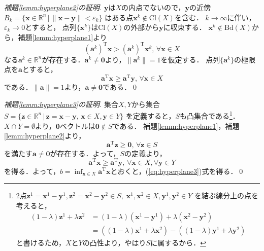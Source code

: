 \documentclass[dvipdfmx]{jsreport}
\begin{document}
\begin{proof}[補題\ref{lemm:hyperplane2}の証明]
  $\bm{y}$は$X$の内点でないので，$\bm{y}$の近傍
  $B_k = \{\bm{x} \in \mathbb{R}^n \, | \, \|\bm{x} - \bm{y}\| < \varepsilon_k\}$
  はある点$\bm{x}^k \notin \mathrm{Cl}(X)$を含む．
  $k \rightarrow \infty$に伴い，$\varepsilon_k \rightarrow 0$とすると，
  点列$\{\bm{x}^k\}$は$\mathrm{Cl}(X)$の外部から$\bm{y}$に収束する．
  $\bm{x}^k \notin \mathrm{Bd}(X)$から，補題\ref{lemm:hyperplane1}より
  \begin{equation}
    (\bm{a}^k)^{\mathrm{T}} \bm{x} > (\bm{a}^k)^{\mathrm{T}} \bm{x}^k, \, \forall \bm{x} \in X \nonumber
  \end{equation}
  なる$\bm{a}^k \in \mathbb{R}^n$が存在する．$\bm{a}^k \neq \bm{0}$より，$\|\bm{a}^k\| = 1$を仮定する．
  点列$\{\bm{a}^k\}$の極限点を$\bm{a}$とすると，
  \begin{equation}
    \bm{a}^{\mathrm{T}} \bm{x} \geq \bm{a}^{\mathrm{T}} \bm{y}, \, \forall \bm{x} \in X \nonumber
  \end{equation}
  である．$\|\bm{a}\| = 1$より，$\bm{a} \neq \bm{0}$である．\qed
\end{proof}

\begin{proof}[補題\ref{lemm:hyperplane3}の証明]
  集合$X, Y$から集合$S = \{\bm{z} \in \mathbb{R}^n \, | \, \bm{z} = \bm{x} - \bm{y}, \, \bm{x} \in X, \bm{y} \in Y\}$
  を定義すると，$S$も凸集合である\footnote{2点$\bm{z}^1 = \bm{x}^1 - \bm{y}^1, \bm{z}^2 = \bm{x}^2 - \bm{y}^2 \in S, \; \bm{x}^1, \bm{x}^2 \in X, \bm{y}^1, \bm{y}^2 \in Y$
  を結ぶ線分上の点を考えると，
  \begin{align}
    (1 - \lambda)\bm{z}^1 + \lambda\bm{z}^2 &= (1 - \lambda)(\bm{x}^1 - \bm{y}^1) + \lambda(\bm{x}^2 - \bm{y}^2) \nonumber \\
    &= ((1 - \lambda)\bm{x}^1 + \lambda\bm{x}^2) - ((1 - \lambda)\bm{y}^1 + \lambda\bm{y}^2) \nonumber
  \end{align}
  と書けるため，$X$と$Y$の凸性より，やはり$S$に属するから．
  }．
  $X \cap Y = \emptyset$より，$\bm{0}$ベクトルは$\bm{0} \notin S$である．
  補題\ref{lemm:hyperplane1}，補題\ref{lemm:hyperplane2}より，
  \begin{equation}
    \bm{a}^{\mathrm{T}} \bm{z} \geq \bm{0}, \, \forall \bm{z} \in S \nonumber
  \end{equation}
  を満たす$\bm{a} \neq \bm{0}$が存在する．よって，$S$の定義より，
  \begin{equation}
    \bm{a}^{\mathrm{T}}\bm{x} \geq \bm{a}^{\mathrm{T}}\bm{y}, \, \forall \bm{x} \in X, \forall \bm{y} \in Y \nonumber
  \end{equation}
  を得る．よって，$b = \inf_{\bm{x} \in X} \bm{a}^{\mathrm{T}}\bm{x}$とおくと，(\ref{eq:hyperplane3})式を得る．\qed
\end{proof}
\end{document}
